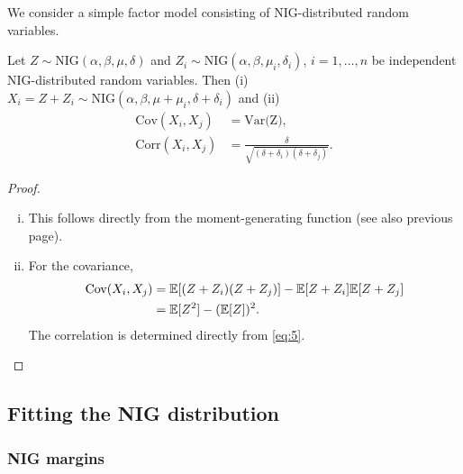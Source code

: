 We consider a simple factor model consisting of NIG-distributed random
variables.
\begin{proposition}
  Let $Z\sim \text{NIG}(\alpha, \beta, \mu, \delta)$ and
  $Z_i\sim \text{NIG}(\alpha, \beta, \mu_i, \delta_i)$,
  $i=1,\ldots, n$ be independent NIG-distributed random
  variables. Then (i) 
  $X_i = Z + Z_i\sim \text{NIG}(\alpha,\beta,\mu+\mu_i,
  \delta+\delta_i)$ and (ii)
  \begin{align}
    \text{Cov}(X_i,X_j) &= \text{Var(Z)},\nonumber\\
    \text{Corr}(X_i,X_j) &= \frac{\delta}{\sqrt{(\delta+\delta_i)
                           (\delta+\delta_j)}}. \label{eq:6}
  \end{align}
\end{proposition}
\begin{proof}
  \begin{enumerate}[(i)]
  \item This follows directly from the moment-generating function (see
    also previous page). 
  \item For the covariance,
    \begin{align*}
      \text{Cov}(X_i,X_j)
      &= {\mathbb{E}}[(Z+Z_i) (Z+Z_j)] - {\mathbb{E}}[Z+Z_i] {\mathbb{E}}[Z+Z_j]\\
      &= {\mathbb{E}}[Z^2] -({\mathbb{E}}[Z])^2.
    \end{align*}
    The correlation is determined directly from \eqref{eq:5}. 
  \end{enumerate}
\end{proof}

\subsection{Fitting the NIG distribution}
\label{sec:fitt-nig-distr}

\subsubsection{NIG margins}
\label{sec:nig-margins}


